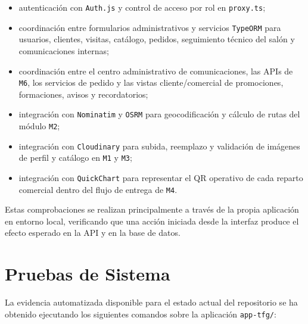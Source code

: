 \begin{itemize}
    \item autenticación con \texttt{Auth.js} y control de acceso por rol en \texttt{proxy.ts};
    \item coordinación entre formularios administrativos y servicios \texttt{TypeORM} para usuarios, clientes, visitas, catálogo, pedidos, seguimiento técnico del salón y comunicaciones internas;
    \item coordinación entre el centro administrativo de comunicaciones, las APIs de \texttt{M6}, los servicios de pedido y las vistas cliente/comercial de promociones, formaciones, avisos y recordatorios;
    \item integración con \texttt{Nominatim} y \texttt{OSRM} para geocodificación y cálculo de rutas del módulo \texttt{M2};
    \item integración con \texttt{Cloudinary} para subida, reemplazo y validación de imágenes de perfil y catálogo en \texttt{M1} y \texttt{M3};
    \item integración con \texttt{QuickChart} para representar el QR operativo de cada reparto comercial dentro del flujo de entrega de \texttt{M4}.
\end{itemize}

Estas comprobaciones se realizan principalmente a través de la propia aplicación en entorno local, verificando que una acción iniciada desde la interfaz produce el efecto esperado en la API y en la base de datos.

\section{Pruebas de Sistema}

La evidencia automatizada disponible para el estado actual del repositorio se ha obtenido ejecutando los siguientes comandos sobre la aplicación \texttt{app-tfg/}:

